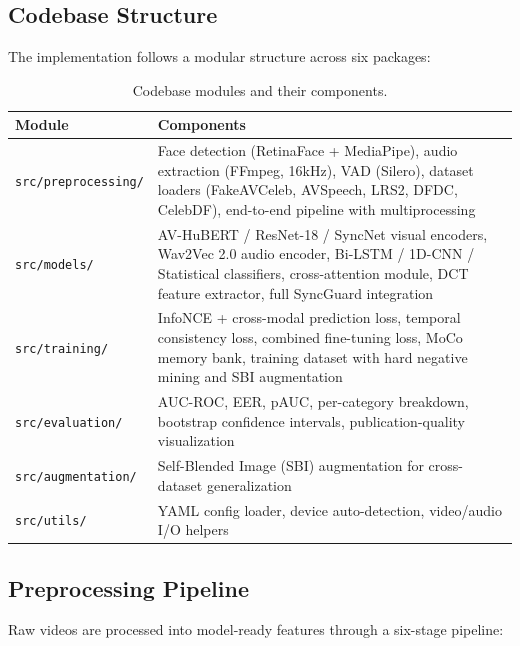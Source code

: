 \documentclass[12pt, letterpaper]{article}
\begin{document}
\subsection{Codebase Structure}

The implementation follows a modular structure across six packages:

\renewcommand{\arraystretch}{1.5}
\begin{table}[H]
\centering
\begin{tabularx}{\textwidth}{@{} p{3.2cm} X @{}}
\toprule
\textbf{Module} & \textbf{Components} \\
\midrule
\texttt{src/preprocessing/} & Face detection (RetinaFace + MediaPipe), audio extraction (FFmpeg, 16kHz), VAD (Silero), dataset loaders (FakeAVCeleb, AVSpeech, LRS2, DFDC, CelebDF), end-to-end pipeline with multiprocessing \\
\texttt{src/models/} & AV-HuBERT / ResNet-18 / SyncNet visual encoders, Wav2Vec 2.0 audio encoder, Bi-LSTM / 1D-CNN / Statistical classifiers, cross-attention module, DCT feature extractor, full SyncGuard integration \\
\texttt{src/training/} & InfoNCE + cross-modal prediction loss, temporal consistency loss, combined fine-tuning loss, MoCo memory bank, training dataset with hard negative mining and SBI augmentation \\
\texttt{src/evaluation/} & AUC-ROC, EER, pAUC, per-category breakdown, bootstrap confidence intervals, publication-quality visualization \\
\texttt{src/augmentation/} & Self-Blended Image (SBI) augmentation for cross-dataset generalization \\
\texttt{src/utils/} & YAML config loader, device auto-detection, video/audio I/O helpers \\
\bottomrule
\end{tabularx}
\caption{Codebase modules and their components.}
\end{table}
\renewcommand{\arraystretch}{1.0}

\subsection{Preprocessing Pipeline}

Raw videos are processed into model-ready features through a six-stage pipeline:
\end{document}
